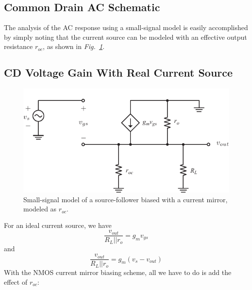 \subsection{Common Drain AC Schematic}
The analysis of the AC response using a small-signal model is easily accomplished by simply noting that the current source can be modeled with an effective output resistance $r_{oc}$, as shown in \emph{Fig.~\ref{fig:cd_amp_ss_av.pdf}}.
\subsection{CD Voltage Gain With Real Current Source}
\begin{figure}[tb]
\centering
\includegraphics[scale=1]{cd_amp_ss_av.pdf}
\caption{Small-signal model of a source-follower biased with a current mirror, modeled as $r_{oc}$.} \label{fig:cd_amp_ss_av.pdf}
\end{figure}
For an ideal current source, we have
    \begin{equation}
        \frac{{{v_{out}}}}{{{R_L}||{r_o}}} = {g_m}{v_{gs}}
    \end{equation}
and
    \begin{equation}
        \frac{{{v_{out}}}}{{{R_L}||{r_o}}} = {g_m}\left( {{v_{s}} - {v_{out}}} \right)
    \end{equation}
With the NMOS current mirror biasing scheme, all we have to do is add the effect of $r_{oc}$: 
